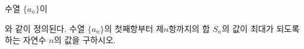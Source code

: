 수열 $\{a_n\}$이\par\smallskip{}\par\smallskip\noindent 와 같이 정의된다. 수열 $\{a_n\}$의 첫째항부터 제$n$항까지의 합 $S_n$의 값이 최대가 되도록 하는 자연수 $n$의 값을 구하시오.
